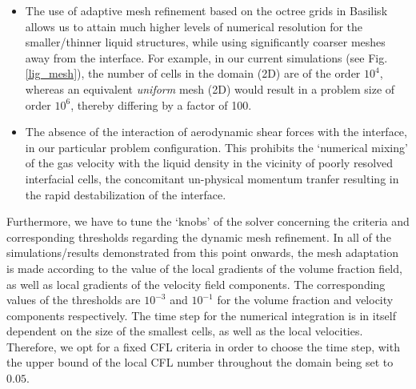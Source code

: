 \begin{itemize}
	\item The use of adaptive mesh refinement based on the octree grids in Basilisk allows 
		us to attain much higher levels of numerical resolution for the smaller/thinner 
		liquid structures, while using significantly coarser meshes away from the interface.
		For example, in our current simulations (see Fig. \ref{lig_mesh}), the number of cells
		in the domain (2D) are of the order $10^4$, whereas an equivalent \textit{uniform} mesh 
		(2D) would result in a problem size of order $10^6$, thereby differing by a factor of 100.
	\item The absence of the interaction of aerodynamic shear forces with the interface, in our particular
		problem configuration. This prohibits the `numerical mixing' of the gas velocity with the
		liquid density in the vicinity of poorly resolved interfacial cells, the concomitant 
		un-physical momentum tranfer resulting in the rapid destabilization of the interface.   
\end{itemize}

Furthermore, we have to tune the `knobs' of the 
solver concerning the criteria and corresponding 
thresholds regarding the dynamic mesh refinement. 
In all of the simulations/results demonstrated 
from this point onwards, the mesh adaptation is 
made according to the value of the local 
gradients of the volume fraction field, 
as well as local gradients of the velocity field components.  
The corresponding values of the thresholds are $10^{-3}$ 
and $10^{-1}$ for the volume fraction and velocity components respectively. 
The time step for the numerical integration is in itself dependent on the 
size of the smallest cells, as well as the local velocities. 
Therefore, we opt for a fixed CFL criteria in order to choose the time step, 
with the upper bound of the local CFL number throughout the domain being set to $0.05$.

